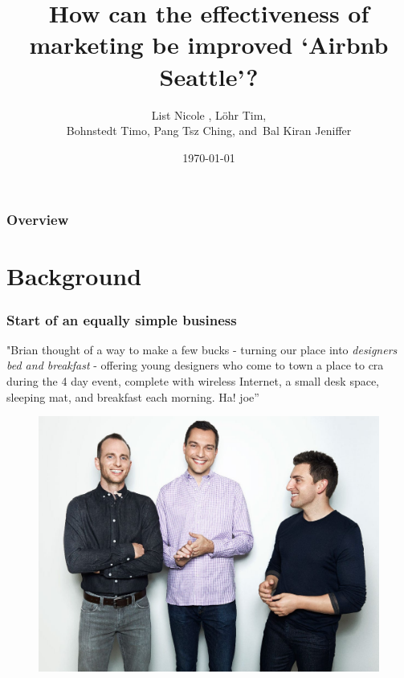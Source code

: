 \documentclass{beamer}
\title[Improve Airbnb's marketing]{How can the effectiveness of marketing be improved ‘Airbnb Seattle’?} %
\author{List Nicole ,
      L\"ohr Tim,\\
      Bohnstedt Timo,
      Pang Tsz Ching,
      and~Bal Kiran Jeniffer%
      }
\institute[Information Systems | IS4861 | Dr. Liu Junming] %
{
City University of Hong Kong\\ %
\medskip
\textit{Project Presentation
Machine Learning for Business IS4861 } 
}
\date{\today} %
\begin{document}
\begin{frame}
\titlepage %
\end{frame}
\begin{frame}
\frametitle{Overview} %
\tableofcontents %
\end{frame}
%

\section{Background}

\begin{frame}
\frametitle{Start of an equally simple business}
"Brian thought of a way to make a few bucks - turning
our place into \textit{designers bed and breakfast} - offering young
designers who come to town a place to cra during the 4 day
event, complete with wireless Internet, a small desk space,
sleeping mat, and breakfast each morning. Ha!
joe”
\begin{figure}
\includegraphics[width=0.4\linewidth]{photo/founders}
\end{figure}
\end{frame}

\end{document}
